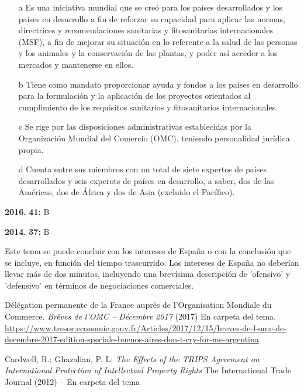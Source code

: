 \documentclass{nuevotema}
\begin{document}
\begin{itemize}
	\item[a] Es una iniciativa mundial que se creó para los países desarrollados y los países en desarrollo a fin de reforzar su capacidad para aplicar las normas, directrices y recomendaciones sanitarias y fitosanitarias internacionales (MSF), a fin de mejorar su situación en lo referente a la salud de las personas y los animales y la conservación de las plantas, y poder así acceder a los mercados y mantenerse en ellos.
	\item[b] Tiene como mandato proporcionar ayuda y fondos a los países en desarrollo para la formulación y la aplicación de los proyectos orientados al cumplimiento de los requisitos sanitarios y fitosanitarios internacionales.
	\item[c] Se rige por las disposiciones administrativas establecidas por la Organización Mundial del Comercio (OMC), teniendo personalidad jurídica propia.
	\item[d] Cuenta entre sus miembros con un total de siete expertos de países desarrollados y seis experots de países en desarrollo, a saber, dos de las Américas, dos de África y dos de Asia (excluido el Pacífico).
\end{itemize}


\notas

\textbf{2016.} \textbf{41:} B

\textbf{2014.} \textbf{37:} B

Este tema se puede concluir con los intereses de España o con la conclusión que se incluye, en función del tiempo trascurrido. Los intereses de España no deberían llevar más de dos minutos, incluyendo una brevísima descripción de 'ofensivo' y 'defensivo' en términos de negociaciones comerciales.

\bibliografia

Délégation permanente de la France auprès de l’Organisation Mondiale du Commerce. \textit{Brèves de l’OMC – Décembre 2017} (2017) En carpeta del tema. \url{https://www.tresor.economie.gouv.fr/Articles/2017/12/15/breves-de-l-omc-de-decembre-2017-edition-speciale-buenos-aires-don-t-cry-for-me-argentina}

Cardwell, R.; Ghazalian, P. L; \textit{The Effects of the TRIPS Agreement on International Protection of Intellectual Property Rights} The International Trade Journal (2012) -- En carpeta del tema
\end{document}
